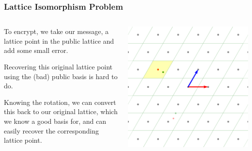 \documentclass[
aspectratio=169, %
t, %
onlytextwidth, %
10pt, %
]{beamer}
\begin{document}
\begin{frame}
    \frametitle{Lattice Isomorphism Problem}
    \begin{columns}[T]
        \begin{column}{0.48\linewidth}
            To encrypt, we take our message, a lattice point in the public lattice and add some small error.
            
            Recovering this original lattice point using the (bad) public basis is hard to do.

            Knowing the rotation, we can convert this back to our original lattice, which we know a good basis for, and can easily recover the corresponding lattice point.
        \end{column}
        \begin{column}{0.48\linewidth}
            \includegraphics[width=\linewidth]{LIP_good_basis.png}
        \end{column}
    \end{columns}
\end{frame}

\end{document}
